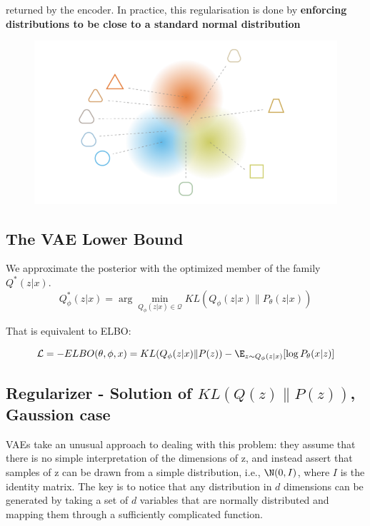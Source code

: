 returned by the encoder. In practice, this regularisation is done by \textbf{enforcing
distributions to be close to a standard normal distribution}
\begin{figure}[H]
    \centering
    \includegraphics[width=12cm]{images/vae_regularisation.png}
    \label{fig:regularised_distributions_vae}
\end{figure}

\subsection{The VAE Lower Bound}
We approximate the posterior with the optimized member of the family $Q^*(z|x)$.
\begin{equation}
    Q_{\phi}^*(z|x) = \arg \min_{Q_{\phi}(z|x) \in \mathcal{Q}} KL(Q_{\phi}(z|x)\|P_{\theta}(z|x))
\end{equation}

That is equivalent to ELBO:

\begin{equation}
    \mathcal{L} = -ELBO(\theta, \phi, x) = KL(Q_{\phi}(z|x)\|P(z)) - \E_{z \sim Q_{\phi}(z|x)} [\log P_{\theta}(x|z)]
\end{equation}

\subsection{Regularizer - Solution of $KL(Q(z)\|P(z))$, Gaussion case}

VAEs take an unusual approach to dealing with this problem: they assume that there is no simple interpretation
of the dimensions of z, and instead assert that samples of z can be drawn from a simple distribution, i.e.,
$\N(0, I)$, where $I$ is the identity matrix. The key is to notice that any distribution in $d$ dimensions
can be generated by taking a set of $d$ variables that are normally distributed and mapping them through a sufficiently
complicated function.

